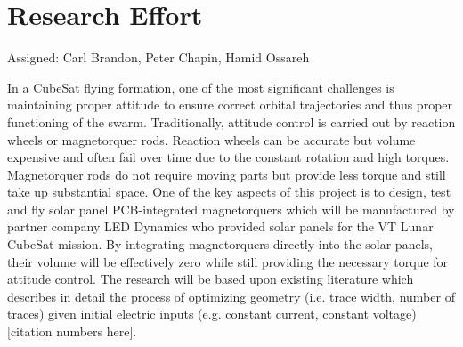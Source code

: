 \section{Research Effort}
Assigned: Carl Brandon, Peter Chapin, Hamid Ossareh

In a CubeSat flying formation, one of the most significant challenges
is maintaining proper attitude to ensure correct orbital trajectories
and thus proper functioning of the swarm. Traditionally, attitude
control is carried out by reaction wheels or magnetorquer
rods. Reaction wheels can be accurate but volume expensive and often
fail over time due to the constant rotation and high
torques. Magnetorquer rods do not require moving parts but provide
less torque and still take up substantial space. One of the key
aspects of this project is to design, test and fly solar panel
PCB-integrated magnetorquers which will be manufactured by partner
company LED Dynamics who provided solar panels for the VT Lunar
CubeSat mission. By integrating magnetorquers directly into the solar
panels, their volume will be effectively zero while still providing
the necessary torque for attitude control. The research will be based
upon existing literature which describes in detail the process of
optimizing geometry (i.e. trace width, number of traces) given initial
electric inputs (e.g. constant current, constant voltage)[citation
  numbers here].

